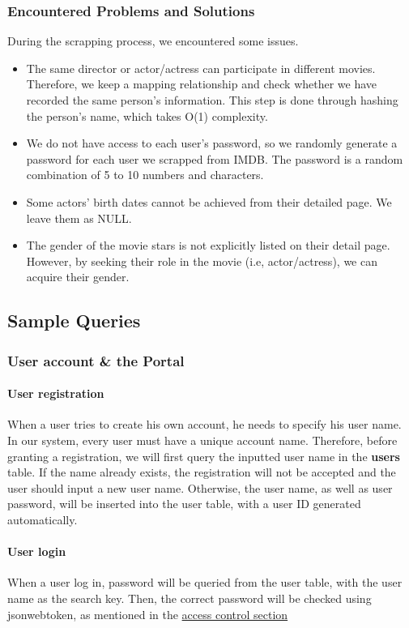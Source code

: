 \begin{CJK*}{UTF8}{gbsn}
\subsubsection{Encountered Problems and Solutions}
During the scrapping process, we encountered some issues.
\begin{itemize}
    \item The same director or actor/actress can participate in different movies. Therefore, we keep a mapping relationship and check whether we have recorded the same person's information. This step is done through hashing the person's name, which takes O(1) complexity.
    \item We do not have access to each user's password, so we randomly generate a password for each user we scrapped from IMDB. The password is a random combination of 5 to 10 numbers and characters.
    \item Some actors' birth dates cannot be achieved from their detailed page. We leave them as NULL.
    \item The gender of the movie stars is not explicitly listed on their detail page. However, by seeking their role in the movie (i.e, actor/actress), we can acquire their gender.
\end{itemize}
\subsection{Sample Queries}
\subsubsection{User account \& the Portal}
\paragraph{User registration}
When a user tries to create his own account, he needs to specify his user name. In our system, every user must have a unique account name. Therefore, before granting a registration, we will first query the inputted user name in the \textbf{users} table. If the name already exists, the registration will not be accepted and the user should input a new user name. Otherwise, the user name, as well as user password, will be inserted into the user table, with a user ID generated automatically.






\paragraph{User login}
When a user log in, password will be queried from the user table, with the user name as the search key. Then, the correct password will be checked using jsonwebtoken, as mentioned in the \hyperref[sec:access]{access control section}


\end{CJK*}
